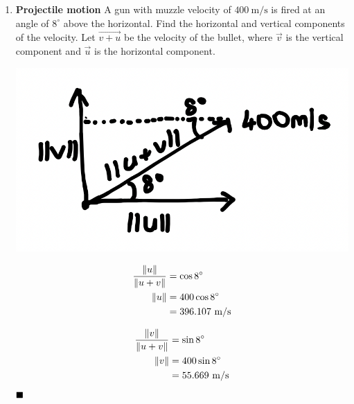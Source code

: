 \begin{enumerate}
    \item \textbf{Projectile motion} A gun with muzzle velocity of $400 \mathrm{~m} / \mathrm{s}$ is fired at an angle of $8^{\circ}$ above the horizontal. Find the horizontal and vertical components of the velocity.
          \sol{} Let $\vec{v + u}$ be the velocity of the bullet, where $\vec{v}$ is the vertical component and $\vec{u}$ is the horizontal component.
          \begin{multicols}{2}
              \begin{center}
                  \includegraphics[scale=0.5]{assets/thomas12.3q25.png}
              \end{center}
              \columnbreak
              \begin{align*}
                  \dfrac{\left\lVert u\right\rVert}{\left\lVert u + v\right\rVert} & = \cos 8^{\circ}                   \\
                  \left\lVert u\right\rVert                       & = 400 \cos 8^{\circ}               \\
                                                 & = 396.107 \mathrm{~m} / \mathrm{s}
              \end{align*}

              \begin{align*}
                  \dfrac{\left\lVert v\right\rVert}{\left\lVert u + v\right\rVert} & = \sin 8^{\circ}                  \\
                  \left\lVert v\right\rVert                       & = 400 \sin 8^{\circ}              \\
                                                 & = 55.669 \mathrm{~m} / \mathrm{s}
              \end{align*}
              $\hfill\blacksquare$

          \end{multicols}


\end{enumerate}
